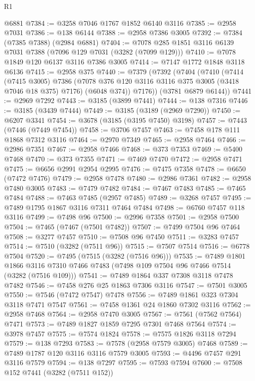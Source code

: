 \begin{lexlean}{R1}
\begin{coremodule}
    @6881
@7384 := @3258 @7046 @1767 @1852 @6140 @3116
@7385 := @2958 @7031
@7386 := @138 @6144
@7388 := @2958 @7386 @3005
@7392 := @7384 (@7385 @7388) (@2984 @6881)
@7404 := @7078 @285 @1851 @3116 @6139 @7031 @7388 (@7096 @129 @7031 (@3282 (@7099 @129)))
@7410 := @7078 @1849 @120 @6137 @3116 @7386 @3005
@7414 := @7147 @1772 @1848 @3118 @6136
@7415 := @2958 @375
@7440 := @7379
    (@7392
      (@7404
        (@7410
          (@7414
            (@7415 @3005)
            @7386
            (@7078 @376 @120 @3116 @3116 @375 @3005 (@3418 @7046 @18 @375) @7176)
            (@6048 @374))
          @7176))
      (@3781 @6879 @6144))
@7441 := @2969 @7292
@7443 := @3185 (@3899 @7441)
@7444 := @138 @7316
@7446 := @3185 (@3439 @7444)
@7449 := @3185 (@3189 (@2969 @7290))
@7450 := @6207 @3341
@7454 := @3678 (@3185 (@3195 @7450) @3198)
@7457 := @7443 (@7446 (@7449 @7454))
@7458 := @3706 @7457
@7463 := @7458 @178 @111 @1868 @7312 @3116
@7464 := @2970 @7349
@7465 := @2958 @7464
@7466 := @2986 @7351
@7467 := @2958 @7466
@7468 := @373 @7353
@7469 := @5400 @7468
@7470 := @373 @7355
@7471 := @7469 @7470
@7472 := @2958 @7471
@7475 := @6656 @2991 @2954 @2995
@7476 := @7475 @7358
@7478 := @6650 (@7472 @7476)
@7479 := @2958 @7478
@7480 := @2986 @7361
@7482 := @2958 @7480 @3005
@7483 := @7479 @7482
@7484 := @7467 @7483
@7485 := @7465 @7484
@7488 := @7463 @7485 (@2957 @7485)
@7489 := @3268 @7457
@7495 := @7489 @1795 @1867 @3116 @7311 @7464 @7484
@7498 := @6760 @7457 @118 @3116
@7499 := @7498 @96
@7500 := @2996 @7358
@7501 := @2958 @7500
@7504 := @7465 (@7467 (@7501 @7482))
@7507 := @7499 @7504 @96 @7464
@7508 := @3277 @7457
@7510 := @7508 @96 @7450
@7511 := @3283 @7457
@7514 := @7510 (@3282 (@7511 @96))
@7515 := @7507 @7514
@7516 := @6778 @7504
@7520 := @7495 (@7515 (@3282 (@7516 @96)))
@7535 := @7489
    @1801
    @1866
    @3116
    @7310
    @7466
    @7483
    (@7498 @109 @7504 @96 @7466 @7514 (@3282 (@7516 @109)))
@7541 := @7489 @1864 @337 @7308 @3118 @7478 @7482
@7546 := @7458 @276 @25 @1863 @7306 @3116
@7547 := @7501 @3005
@7550 := @7546 (@7472 @7547) @7478
@7556 := @7489 @1861 @323 @7304 @3118 @7471 @7547
@7561 := @7458 @1361 @24 @1860 @7302 @3116
@7562 := @2958 @7468
@7564 := @2958 @7470 @3005
@7567 := @7561 (@7562 @7564) @7471
@7573 := @7489 @1827 @1859 @7295 @7301 @7468 @7564
@7574 := @3978 @7457
@7575 := @7574 @1824
@7578 := @7575 @1826 @3118 @7294
@7579 := @138 @7293
@7583 := @7578 (@2958 @7579 @3005) @7468
@7589 := @7489 @1787 @120 @3116 @3116 @7579 @3005
@7593 := @4496 @7457 @291 @3116 @7579
@7594 := @138 @7297
@7595 := @7593 @7594
@7600 := @7508 @152 @7441 (@3282 (@7511 @152))

\end{coremodule}
\end{lexlean}
